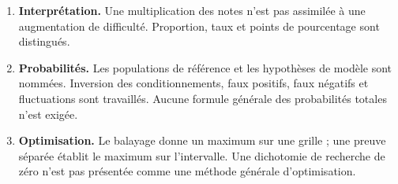 \begin{enumerate}
\item \textbf{Interprétation.} Une multiplication des notes n'est pas assimilée à une augmentation de difficulté. Proportion, taux et points de pourcentage sont distingués.
\item \textbf{Probabilités.} Les populations de référence et les hypothèses de modèle sont nommées. Inversion des conditionnements, faux positifs, faux négatifs et fluctuations sont travaillés. Aucune formule générale des probabilités totales n'est exigée.
\item \textbf{Optimisation.} Le balayage donne un maximum sur une grille ; une preuve séparée établit le maximum sur l'intervalle. Une dichotomie de recherche de zéro n'est pas présentée comme une méthode générale d'optimisation.
\end{enumerate}

